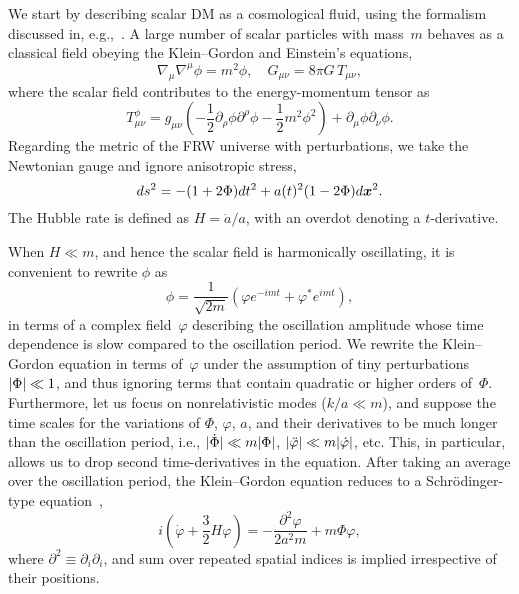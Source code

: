\documentclass[11pt,nofootinbib]{article}
\numberwithin{equation}{section}
\begin{document}
We start by describing scalar DM as a cosmological fluid,
using the formalism discussed in,
e.g.,~\cite{Arvanitaki:2009fg,Hu:2000ke,Hui:2016ltb,Widrow:1993qq}.
A large number of scalar particles with mass~$m$ behaves as a
classical field obeying the Klein--Gordon and Einstein's equations,
\begin{equation}
 \nabla_\mu \nabla^\mu \phi = m^2 \phi,
  \quad
  G_{\mu \nu} = 8 \pi G \, T_{\mu \nu},
  \label{KG}
\end{equation}
where the scalar field contributes to the energy-momentum tensor as
\begin{equation}
 T_{\mu \nu}^\phi = g_{\mu \nu}
  \left( -\frac{1}{2} \partial_\rho \phi \partial^\rho \phi -
   \frac{1}{2} m^2 \phi^2 \right)
  + \partial_\mu \phi \partial_\nu \phi.
\end{equation}
Regarding the metric of the FRW universe with perturbations,
we take the Newtonian gauge and ignore anisotropic stress, 
\begin{equation}
 ds^2 = - (1 + 2 \Phi) dt^2 + a(t)^2 (1- 2 \Phi) d \boldsymbol{x}^2. 
\end{equation}
The Hubble rate is defined as $H = \dot{a} / a$, with an overdot
denoting a $t$-derivative. 

When $H \ll m$, and hence the scalar field is harmonically oscillating,
it is convenient to rewrite $\phi$ as
\begin{equation}
 \phi = \frac{1}{\sqrt{2 m}}
  \left( \varphi e^{-imt} + \varphi^* e^{imt} \right),
\end{equation}
in terms of a complex field~$\varphi$ describing the oscillation
amplitude whose time dependence is slow compared to the oscillation period.
We rewrite the Klein--Gordon equation in terms of~$\varphi$
under the assumption of tiny perturbations $\lvert\Phi\rvert \ll 1$,
and thus ignoring terms that 
contain quadratic or higher orders of~$\Phi$.
Furthermore, let us focus on nonrelativistic modes ($k / a \ll m$),
and suppose the time scales for the variations of 
$\Phi$, $\varphi$, $a$, and their derivatives to be much longer than the
oscillation period,
i.e., $\lvert\dot{\Phi}\rvert \ll m \lvert\Phi\rvert$, $\lvert\ddot{\varphi}\rvert \ll m
\lvert\dot{\varphi}\rvert$, etc.
This, in particular,  allows us to drop second time-derivatives
in the equation.
After taking an average over the oscillation period,
the Klein--Gordon equation reduces to a Schr{\"o}dinger-type
equation~\cite{Widrow:1993qq}, 
\begin{equation}
 i\left(\dot{\varphi}  + \frac{3}{2} H \varphi \right) =
  -\frac{\partial^2 \varphi}{2 a^2 m}  +
  m \Phi \varphi,
\label{schr}
\end{equation}
where $\partial^2 \equiv \partial_i \partial_i$, and sum over repeated
spatial indices is implied irrespective of their positions.
\end{document}
